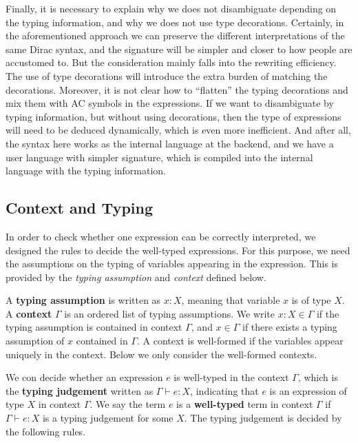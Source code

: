 \documentclass[manuscript, review, timestamp]{acmart}
\begin{document}
Finally, it is necessary to explain why we does not disambiguate depending on the typing information, and why we does not use type decorations.
Certainly, in the aforementioned approach we can preserve the different interpretations of the same Dirac syntax, and the signature will be simpler and closer to how people are accustomed to.
But the consideration mainly falls into 
the rewriting efficiency. 
The use of type decorations will introduce the extra burden of matching the decorations. Moreover, it is not clear how to ``flatten'' the typing decorations and mix them with AC symbols in the expressions.
If we want to disambiguate by typing information, but without using decorations, then the type of expressions will need to be deduced dynamically, which is even more inefficient.
And after all, the syntax here works as the internal language at the backend, and we have a user language with simpler signature, which is compiled into the internal language with the typing information.





\subsection{Context and Typing}
In order to check whether one expression can be correctly interpreted, we designed the rules to decide the well-typed expressions. For this purpose, we need the assumptions on the typing of variables appearing in the expression. This is provided by the \textit{typing assumption} and \textit{context} defined below.

\begin{definition}[context]
  A \textbf{typing assumption} is written as $x : X$, meaning that variable $x$ is of type $X$. A \textbf{context} $\Gamma$ is an ordered list of typing assumptions. We write $x : X \in \Gamma$ if the typing assumption is contained in context $\Gamma$, and $x \in \Gamma$ if there exists a typing assumption of $x$ contained in $\Gamma$. A context is well-formed if the variables appear uniquely in the context. Below we only consider the well-formed contexts.
\end{definition}

We con decide whether an expression $e$ is well-typed in the context $\Gamma$, which is the \textbf{typing judgement} written as $\Gamma \vdash e : X$, indicating that $e$ is an expression of type $X$ in context $\Gamma$.
We say the term $e$ is a \textbf{well-typed} term in context $\Gamma$ if $\Gamma \vdash e : X$ is a typing judgement for some $X$. The typing judgement is decided by the following rules.
\end{document}
